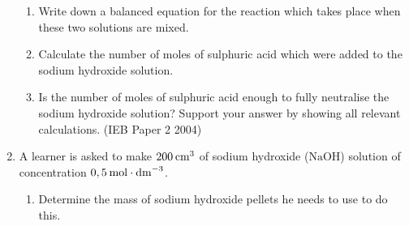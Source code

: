 \begin{enumerate}[noitemsep, label=\textbf{\arabic*}. ]
\label{m38712*id286663}\begin{enumerate}[noitemsep, label=\textbf{\alph*}. ] 
            \label{m38712*uid148}\item Write down a balanced equation for the reaction which takes place when these two solutions are mixed.
\label{m38712*uid149}\item Calculate the number of moles of sulphuric acid which were added to the sodium hydroxide solution.
\label{m38712*uid150}\item Is the number of moles of sulphuric acid enough to fully neutralise the sodium hydroxide solution? Support your answer by showing all relevant calculations.
(IEB Paper 2 2004)
\end{enumerate}
                \label{m38712*uid155}\item A learner is asked to make \begin{math}200\phantom{\rule{2pt}{0ex}}{\mathrm{cm}}^{3}\end{math} of sodium hydroxide (\begin{math}\mathrm{NaOH}\end{math}) solution of concentration \begin{math}0,5\phantom{\rule{2pt}{0ex}}\mathrm{mol}\ensuremath{\cdot}{\mathrm{dm}}^{-3}\end{math}.
\label{m38712*id286969}\begin{enumerate}[noitemsep, label=\textbf{\alph*}. ] 
            \label{m38712*uid156}\item Determine the mass of sodium hydroxide pellets he needs to use to do this.

\end{enumerate}
\end{enumerate}
